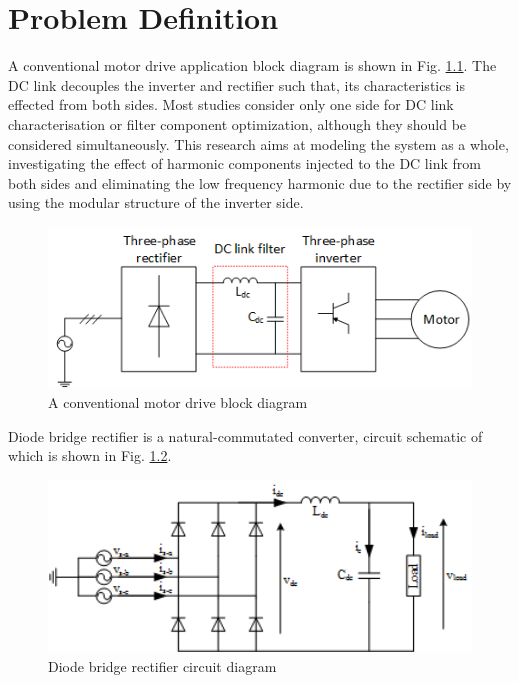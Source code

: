 \chapter{Problem Definition}
\label{chap:problem-definition}

A conventional motor drive application block diagram is shown in Fig. \ref{fig:conv_motor_drive}. The DC link decouples the inverter and rectifier such that, its characteristics is effected from both sides. Most studies consider only one side for DC link characterisation or filter component optimization, although they should be considered simultaneously. This research aims at modeling the system as a whole, investigating the effect of harmonic components injected to the DC link from both sides and eliminating the low frequency harmonic due to the rectifier side by using the modular structure of the inverter side.

\begin{figure}[htp]
  \centering
  \includegraphics[width=15cm]{images/conv_motor_drive}
  \caption{A conventional motor drive block diagram}
  \label{fig:conv_motor_drive}
\end{figure}

Diode bridge rectifier is a natural-commutated converter, circuit schematic of which is shown in Fig. \ref{fig:rect_circuit}.

\begin{figure}[htp]
  \centering
  \includegraphics[width=15cm]{images/rect_circuit}
  \caption{Diode bridge rectifier circuit diagram}
  \label{fig:rect_circuit}
\end{figure}

